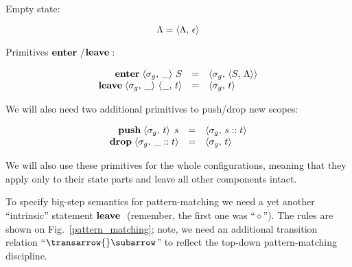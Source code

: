 Empty state:

\[
\Lambda=\left<{\Lambda,\,\epsilon}\right>
\]

Primitives $\mathbf{enter}\;{}$/$\mathbf{leave}\;{}$:

\[
\begin{array}{rcl}
  \mathbf{enter}\;{\left<{\sigma_g,\,\_}\right>\,S} & = & \left<{\sigma_g,\,\left<{S,\,\Lambda}\right>}\right>\\
  \mathbf{leave}\;{\left<{\sigma_g,\,\_}\right>\,\left<{\_,\,t}\right>}& = & \left<{\sigma_g,\,t}\right>
\end{array}
\]

We will also need two additional primitives to push/drop new scopes:

\[
\begin{array}{rcl}
  \mathbf{push}\;{\left<{\sigma_g,\,t}\right>\;s}&=&\left<{\sigma_g,\,s::t}\right>\\
  \mathbf{drop}\;{\left<{\sigma_g,\,\_::t}\right>}&=&\left<{\sigma_g,\,t}\right>
\end{array}
\]

We will also use these primitives for the whole configurations, meaning that they apply only to their state parts and leave
all other components intact.

To specify big-step semantics for pattern-matching we need a yet another ``intrinsic'' statement
$\mathbf{leave}\;{}$ (remember, the first one was ``$\diamond$''). The rules are shown on Fig.~\ref{pattern_matching}; note,
we need an additional transition relation ``${\setsubarrow{_{\mathscr P}}\transarrow{}\subarrow}$'' to reflect the top-down
pattern-matching discipline.

